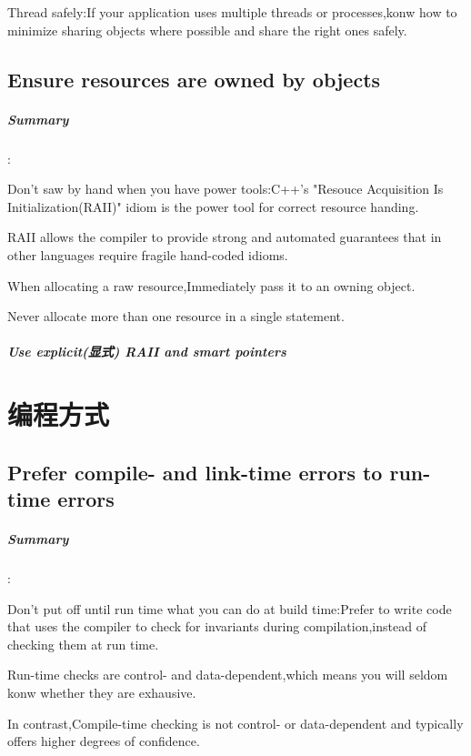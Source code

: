 \documentclass[UTF8,a4paper,12pt]{ctexbook}
\begin{document}
			Thread safely:If your application uses multiple threads or processes,konw how to minimize sharing objects where possible and share the right ones safely.
		
	\section{Ensure resources are owned by objects}
		\paragraph{Summary}:
			
			Don't saw by hand when you have power tools:C++'s "Resouce Acquisition Is Initialization(RAII)" idiom is the power tool for correct resource handing.
			
			RAII allows the compiler to provide strong and automated guarantees that in other languages require fragile hand-coded idioms.
			
			When allocating a raw resource,Immediately pass it to an owning object.
			
			Never allocate more than one resource in a single statement.
		
		\paragraph{Use explicit(显式) RAII and smart pointers}
	
 
\chapter{编程方式}
	\section{Prefer compile- and link-time errors to run-time errors}
		\paragraph{Summary}:
		
			Don't put off until run time what you can do at build time:Prefer to write code that uses the compiler to check for invariants during compilation,instead of checking them at run time.
			
			Run-time checks are control- and data-dependent,which means you will seldom konw whether they are exhausive.
			
			In contrast,Compile-time checking is not control- or data-dependent and typically offers higher degrees of confidence.
			
\end{document}
